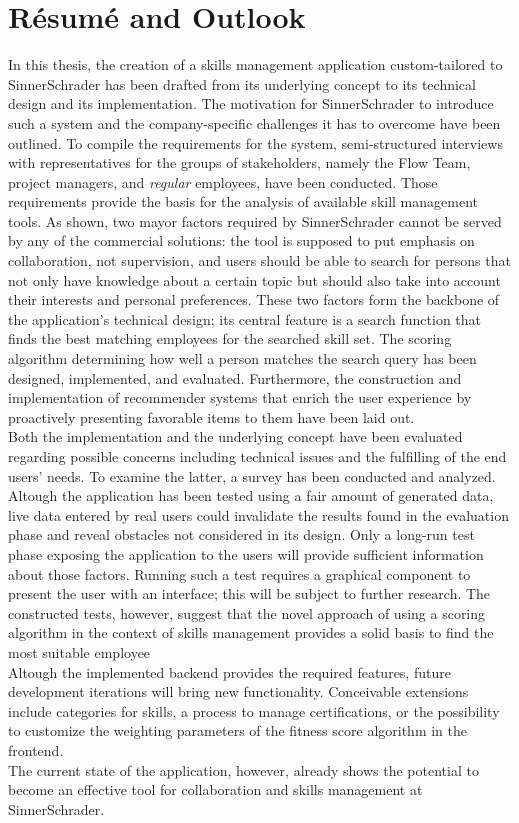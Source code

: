 \chapter{Résumé and Outlook}
In this thesis, the creation of a skills management application custom-tailored to SinnerSchrader has been drafted from its underlying concept to its technical design and its implementation. The motivation for SinnerSchrader to introduce such a system and the company-specific challenges it has to overcome have been outlined.
To compile the requirements for the system, semi-structured interviews with representatives for the groups of stakeholders, namely the Flow Team, project managers, and \textit{regular} employees, have been conducted. Those requirements provide the basis for the analysis of available skill management tools. As shown, two mayor factors required by SinnerSchrader cannot be served by any of the commercial solutions: the tool is supposed to put emphasis on collaboration, not supervision, and users should be able to search for persons that not only have knowledge about a certain topic but should also take into account their interests and personal preferences. These two factors form the backbone of the application's technical design; its central feature is a search function that finds the best matching employees for the searched skill set. The scoring algorithm determining how well a person matches the search query has been designed, implemented, and evaluated. Furthermore, the construction and implementation of recommender systems that enrich the user experience by proactively presenting favorable items to them have been laid out.\\
Both the implementation and the underlying concept have been evaluated regarding possible concerns including technical issues and the fulfilling of the end users' needs. To examine the latter, a survey has been conducted and analyzed.\\
Altough the application has been tested using a fair amount of generated data, live data entered by real users could invalidate the results found in the evaluation phase and reveal obstacles not considered in its design. Only a long-run test phase exposing the application to the users will provide sufficient information about those factors. Running such a test requires a graphical component to present the user with an interface; this will be subject to further research.
The constructed tests, however, suggest that the novel approach of using a scoring algorithm in the context of skills management provides a solid basis to find the
most suitable employee\\
Altough the implemented backend provides the required features, future development iterations will bring new functionality. Conceivable extensions include categories for skills, a process to manage certifications, or the possibility to customize the weighting parameters of the fitness score algorithm in the frontend.\\
The current state of the application, however, already shows the potential to become an effective tool for collaboration and skills management at SinnerSchrader.
